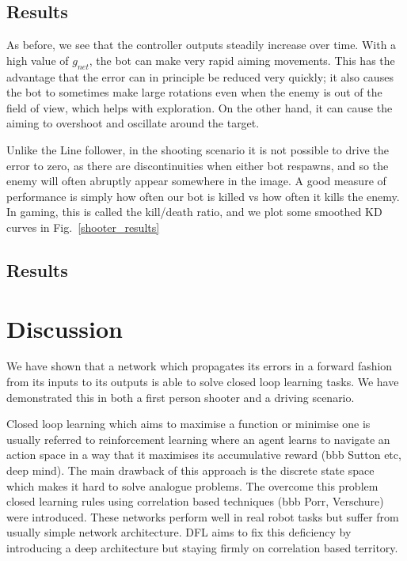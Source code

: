 \documentclass{llncs}
\begin{document}
\subsection{Results}

As before, we see that the controller outputs steadily increase over time. With a high value of $g_{net}$, the bot can make very rapid aiming movements. This has the advantage that the error can in principle be reduced very quickly; it also causes the bot to sometimes make large rotations even when the enemy is out of the field of view, which helps with exploration. On the other hand, it can cause the aiming to overshoot and oscillate around the target. 

Unlike the Line follower, in the shooting scenario it is not possible to drive the error to zero, as there are discontinuities when either bot respawns, and so the enemy will often abruptly appear somewhere in the image. A good measure of performance is simply how often our bot is killed vs how often it kills the enemy. In gaming, this is called the kill/death ratio, and we plot some smoothed KD curves in Fig.~\ref{shooter_results}



\subsection{Results}


\section{Discussion}
We have shown that a network which propagates its errors in a forward
fashion from its inputs to its outputs is able to solve closed loop
learning tasks. We have demonstrated this in both a first person
shooter and a driving scenario.

Closed loop learning which aims to maximise a function or minimise one
is usually referred to reinforcement learning where an agent learns to
navigate an action space in a way that it maximises its accumulative
reward (bbb Sutton etc, deep mind). The main drawback of this approach
is the discrete state space which makes it hard to solve analogue
problems. The overcome this problem closed learning rules using
correlation based techniques (bbb Porr, Verschure) were introduced.
These networks perform well in real robot tasks but suffer from
usually simple network architecture. DFL aims to fix this
deficiency by introducing a deep architecture but staying firmly
on correlation based territory.
\end{document}
